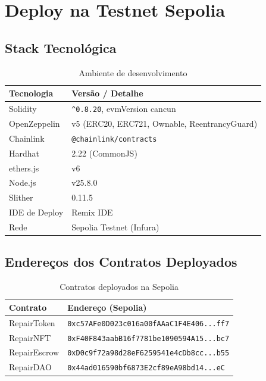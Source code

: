 \documentclass[
    12pt,
    a4paper,
    oneside,
    brazil,
    sumario=tradicional
]{abntex2}
\begin{document}
\section{Deploy na Testnet Sepolia}

\subsection{Stack Tecnológica}

\begin{table}[h]
\caption{Ambiente de desenvolvimento}
\label{tab:stack}
\begin{tabularx}{\textwidth}{@{}lX@{}}
\toprule
\textbf{Tecnologia} & \textbf{Versão / Detalhe} \\
\midrule
Solidity       & \texttt{\^{}0.8.20}, evmVersion cancun \\
OpenZeppelin   & v5 (ERC20, ERC721, Ownable, ReentrancyGuard) \\
Chainlink      & \texttt{@chainlink/contracts} \\
Hardhat        & 2.22 (CommonJS) \\
ethers.js      & v6 \\
Node.js        & v25.8.0 \\
Slither        & 0.11.5 \\
IDE de Deploy  & Remix IDE \\
Rede           & Sepolia Testnet (Infura) \\
\bottomrule
\end{tabularx}
\end{table}

\subsection{Endereços dos Contratos Deployados}

\begin{table}[h]
\caption{Contratos deployados na Sepolia}
\label{tab:deploy}
\begin{tabularx}{\textwidth}{@{}lX@{}}
\toprule
\textbf{Contrato} & \textbf{Endereço (Sepolia)} \\
\midrule
RepairToken  & \texttt{0xc57AFe0D023c016a00fAAaC1F4E406...ff7} \\
RepairNFT    & \texttt{0xF40F843aabB16f7781be1090594A15...bc7} \\
RepairEscrow & \texttt{0xD0c9f72a98d28eF6259541e4cDb8cc...b55} \\
RepairDAO    & \texttt{0x44ad016590bf6873E2cf89eA98bd14...eC}  \\
\bottomrule
\end{tabularx}
\end{table}
\end{document}

